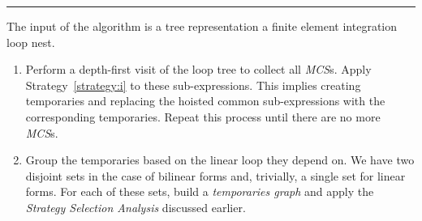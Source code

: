 \noindent\rule[0.01ex]{\linewidth}{0.7pt}

\begin{Algo}
\label{algo:sharing-elimination}
\normalfont 
The input of the algorithm is a tree representation a finite element integration loop nest.
\begin{enumerate}
\item Perform a depth-first visit of the loop tree to collect all {\em MCS}s. Apply Strategy~\ref{strategy:i} to these sub-expressions. This implies creating temporaries and replacing the hoisted common sub-expressions with the corresponding temporaries. Repeat this process until there are no more {\em MCS}s.

\item Group the temporaries based on the linear loop they depend on. We have two disjoint sets in the case of bilinear forms and, trivially, a single set for linear forms. For each of these sets, build a {\em temporaries graph} and apply the {\em Strategy Selection Analysis} discussed earlier. 
 
%


\end{enumerate}
\end{Algo}
